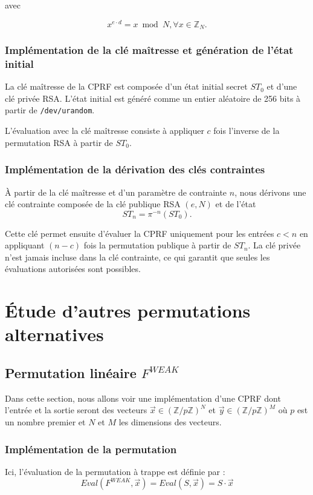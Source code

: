 \documentclass[9pt]{extarticle}
\begin{document}
avec 

\[
x^{e \cdot d} = x \bmod N , \forall x \in \mathbb{Z}_N.
\] 


\subsubsection{Implémentation de la clé maîtresse et génération de l’état initial}

La clé maîtresse de la CPRF est composée d’un état initial secret $ST_0$ et d’une clé
privée RSA. L’état initial est généré comme un entier aléatoire de 256 bits à partir de
\texttt{/dev/urandom}.

L’évaluation avec la clé maîtresse consiste à appliquer $c$ fois l’inverse de la permutation
RSA à partir de $ST_0$.

\subsubsection{Implémentation de la dérivation des clés contraintes}

À partir de la clé maîtresse et d’un paramètre de contrainte $n$, nous dérivons une clé
contrainte composée de la clé publique RSA $(e, N)$ et de l’état
\[
ST_n = \pi^{-n}(ST_0).
\]

Cette clé permet ensuite d’évaluer la CPRF uniquement pour les entrées $c < n$ en
appliquant $(n-c)$ fois la permutation publique à partir de $ST_n$. La clé privée n’est
jamais incluse dans la clé contrainte, ce qui garantit que seules les évaluations autorisées
sont possibles.


\section{Étude d'autres permutations alternatives}
\subsection{Permutation linéaire $F^{WEAK}$}

Dans cette section, nous allons voir une implémentation d'une CPRF dont l'entrée et la sortie seront des vecteurs $\vec{x} \in (\mathbb{Z}/p\mathbb{Z})^N $ et $\vec{y} \in (\mathbb{Z}/p\mathbb{Z})^M$ où $p$ est un nombre premier et $N$ et $M$ les dimensions des vecteurs.

\subsubsection{Implémentation de la permutation}
Ici, l'évaluation de la permutation à trappe est définie par :
\[Eval(F^{WEAK},\vec{x}) = Eval(S,\vec{x}) = S \cdot \vec{x}\] 
\end{document}
